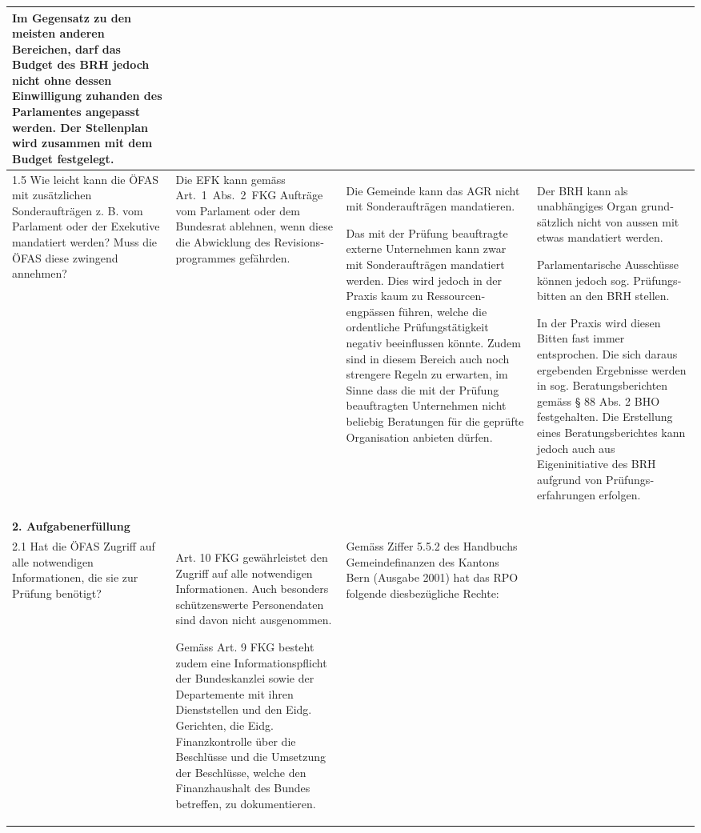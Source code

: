\documentclass[10pt]{article}
\begin{document}
\begin{landscape}
\begin{center}
\begin{longtable}{|p{4cm}|p{5cm}|p{7.5cm}|p{7.5cm}|}
Im Gegensatz zu den meisten anderen Bereichen, darf das Budget des BRH jedoch nicht ohne dessen Einwilligung zuhanden des Parlamentes angepasst werden. Der Stellenplan wird zusammen mit dem Budget festgelegt.

 \\
\hline
1.5 Wie leicht kann die ÖFAS mit zusätzlichen Sonderaufträgen z. B. vom Parlament oder der Exekutive mandatiert werden? Muss die ÖFAS diese zwingend annehmen? & Die EFK kann gemäss Art.~1~Abs.~2~FKG Aufträge vom Parlament oder dem Bundesrat ablehnen, wenn diese die Abwicklung des Revisions­programmes gefährden. & Die Gemeinde kann das AGR nicht mit Sonderaufträgen mandatieren. 

Das mit der Prüfung beauftragte externe Unternehmen kann zwar mit Sonderaufträgen mandatiert werden. Dies wird jedoch in der Praxis kaum zu Ressourcen­engpässen führen, welche die ordentliche Prüfungstätigkeit negativ beeinflussen könnte. Zudem sind in diesem Bereich auch noch strengere Regeln zu erwarten, im Sinne dass die mit der Prüfung beauftragten Unternehmen nicht beliebig Beratungen für die geprüfte Organisation anbieten dürfen.

 & Der BRH kann als unabhängiges Organ grund­sätzlich nicht von aussen mit etwas mandatiert werden. 

Parlamentarische Ausschüsse können jedoch sog. Prüfungs­bitten an den BRH stellen.

In der Praxis wird diesen Bitten fast immer entsprochen. Die sich daraus ergebenden Ergebnisse werden in sog. Beratungs­berichten gemäss § 88 Abs. 2 BHO festgehalten. Die Erstellung eines Beratungsberichtes kann jedoch auch aus Eigeninitiative des BRH aufgrund von Prüfung­s­erfahrungen erfolgen. 

 \\
\hline
\textbf{2. Aufgabenerfüllung} &  &  &  \\
\hline
2.1 Hat die ÖFAS Zugriff auf alle notwendigen Informationen, die sie zur Prüfung benötigt? & Art. 10 FKG gewährleistet den Zugriff auf alle notwendigen Informationen. Auch besonders schützenswerte Personendaten sind davon nicht ausgenommen.

Gemäss Art. 9 FKG besteht zudem eine Informationspflicht der Bundeskanzlei sowie der Departemente mit ihren Dienststellen und den Eidg. Gerichten, die Eidg. Finanzkontrolle über die Beschlüsse und die Umsetzung der Beschlüsse, welche den Finanzhaushalt des Bundes betreffen, zu dokumentieren.

 & Gemäss Ziffer 5.5.2 des Handbuchs Gemeindefinanzen des Kantons Bern (Ausgabe 2001) hat das RPO folgende diesbezügliche Rechte:


\end{longtable}
\end{center}
\end{landscape}
\end{document}
